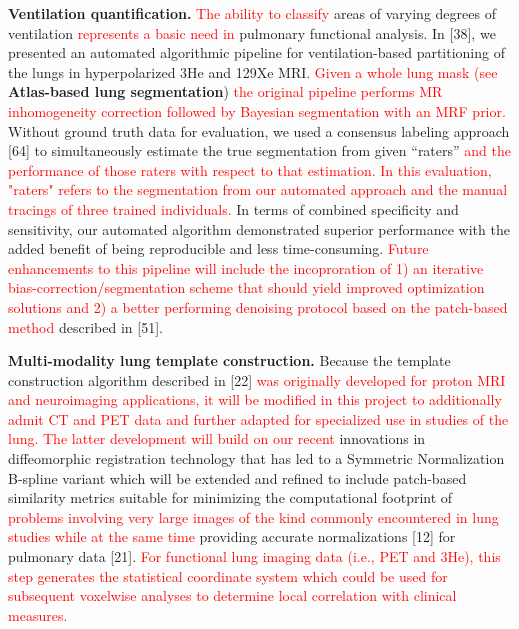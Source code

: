 \documentclass[11pt,]{article}
\begin{document}
\textbf{Ventilation quantification.}
\textcolor{red}{The ability to classify} areas of varying degrees of
ventilation \textcolor{red}{represents a basic need in} pulmonary
functional analysis. In {[}38{]}, we presented an automated algorithmic
pipeline for ventilation-based partitioning of the lungs in
hyperpolarized 3He and 129Xe MRI.
\textcolor{red}{Given a whole lung mask (see } \textbf{Atlas-based lung
segmentation})
\textcolor{red}{the original pipeline performs MR inhomogeneity correction followed by
Bayesian segmentation with an MRF prior.} Without ground truth data for
evaluation, we used a consensus labeling approach {[}64{]} to
simultaneously estimate the true segmentation from given ``raters''
\textcolor{red}{and the performance of those raters with respect to that estimation.
In this evaluation, "raters" refers to the segmentation from our automated approach
and the manual tracings of three trained individuals.} In terms of
combined specificity and sensitivity, our automated algorithm
demonstrated superior performance with the added benefit of being
reproducible and less time-consuming.
\textcolor{red}{Future enhancements to this pipeline will include the incoproration
of 1) an iterative bias-correction/segmentation scheme that should yield improved
optimization solutions and 2) a better performing denoising protocol based on the patch-based
method} described in {[}51{]}.

\textbf{Multi-modality lung template construction.} Because the template
construction algorithm described in {[}22{]} \textcolor{red}{was
originally developed for proton MRI and neuroimaging applications, it will be
modified in this project to additionally admit CT and PET data and further
adapted for specialized use in studies of the lung.
The latter development will build on our recent} innovations in
diffeomorphic registration technology that has led to a Symmetric
Normalization B-spline variant which will be extended and refined to
include patch-based similarity metrics suitable for minimizing the
computational footprint of
\textcolor{red}{problems involving very large images of the kind commonly
encountered in lung studies while at the same time} providing accurate
normalizations {[}12{]} for pulmonary data {[}21{]}.
\textcolor{red}{For functional lung imaging data (i.e., PET and 3He), this
step generates the statistical coordinate system which could be used for subsequent
voxelwise analyses to determine local correlation with clinical measures.}
\end{document}

